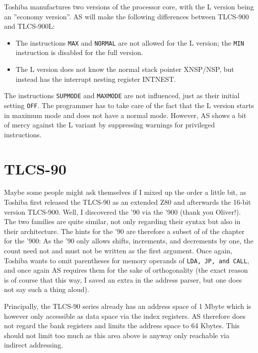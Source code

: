 \documentclass[12pt,twoside]{report}
\newcommand{\tty}[1]{{\tt #1}}
\newcommand{\asname}{{AS}}
\begin{document}
Toshiba manufactures two versions of the processor core, with the L
version being an ''economy version''.  \asname{} will make the following
differences between TLCS-900 and TLCS-900L:
\begin{itemize}
\item{The instructions \tty{MAX} and \tty{NORMAL} are not allowed for the L version;
      the \tty{MIN} instruction is disabled for the full version.}
\item{The L version does not know the normal stack pointer XNSP/NSP, but
      instead has the interrupt nesting register INTNEST.}
\end{itemize}
The instructions \tty{SUPMODE} and \tty{MAXMODE} are not influenced, just as
their initial setting \tty{OFF}.  The programmer has to take care of the
fact that the L version starts in maximum mode and does not have a
normal mode.  However, \asname{} shows a bit of mercy against the L variant
by suppressing warnings for privileged instructions.


\section{TLCS-90}

Maybe some people might ask themselves if I mixed up the order a
little bit, as Toshiba first released the TLCS-90 as an extended Z80
and afterwards the 16-bit version TLCS-900.  Well, I discovered the
'90 via the '900 (thank you Oliver!).  The two families are quite
similar, not only regarding their syntax but also in their
architecture.  The hints for the '90 are therefore a subset of of the
chapter for the '900: As the '90 only allows shifts, increments, and
decrements by one, the count need not and must not be written as the
first argument.  Once again, Toshiba wants to omit parentheses for
memory operands of \tty{LDA, JP, and CALL}, and once again \asname{} requires them
for the sake of orthogonality (the exact reason is of course that
this way, I saved an extra in the address parser, but one does not
say such a thing aloud).

Principally, the TLCS-90 series already has an address space of 1
Mbyte which is however only accessible as data space via the index
registers.  \asname{} therefore does not regard the bank registers and
limits the address space to 64 Kbytes.  This should not limit too
much as this area above is anyway only reachable via indirect
addressing.
\end{document}
